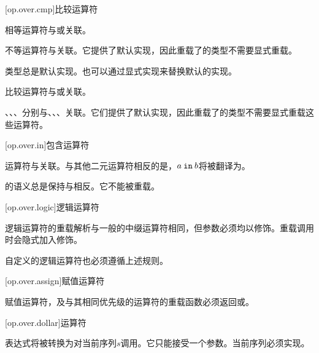 [op.over.cmp]{比较运算符}

\pnum
相等运算符\tcode{==}与或关联。

\pnum
不等运算符\tcode{!=}与关联。它提供了默认实现，因此重载了\tcode{==}的类型不需要显式重载\tcode{!=}。

\pnum
类型总是默认实现。也可以通过显式实现来替换默认的实现。

\pnum
比较运算符与或关联。

\pnum
\tcode{<}、\tcode{<=}、\tcode{>}、\tcode{>=}分别与、、、关联。它们提供了默认实现，因此重载了的类型不需要显式重载这些运算符。

[op.over.in]{包含运算符}

\pnum
{}运算符与关联。与其他二元运算符相反的是，$a\mathbin{\texttt{in}}b$将被翻译为。

\pnum
{}的语义总是保持与相反。它不能被重载。

[op.over.logic]{逻辑运算符}

\pnum
逻辑运算符的重载解析与一般的中缀运算符相同，但参数必须均以修饰。重载调用时会隐式加入修饰。

\pnum
自定义的逻辑运算符也必须遵循上述规则。

[op.over.assign]{赋值运算符}

\pnum
赋值运算符，及与其相同优先级的运算符的重载函数必须返回或。

[op.over.dollar]{\tcode{\$}运算符}

\pnum
\tcode{\$}表达式将被转换为对当前序列$s$调用。它只能接受一个参数。当前序列必须实现。
